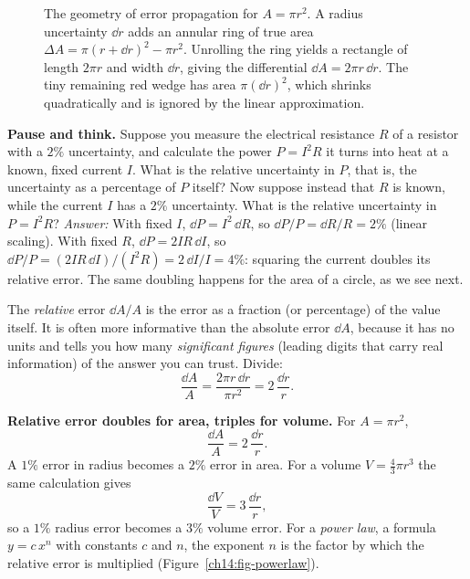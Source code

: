\begin{figure}[H]
\caption{The geometry of error propagation for $A = \pi r^2$. A radius uncertainty $\dd r$
adds an annular ring of true area $\Delta A = \pi(r+\dd r)^2 - \pi r^2$. Unrolling the ring
yields a rectangle of length $2\pi r$ and width $\dd r$, giving the differential $\dd A =
2\pi r\,\dd r$. The tiny remaining red wedge has area $\pi(\dd r)^2$, which shrinks quadratically
and is ignored by the linear approximation.}
\label{ch14:fig-circle-error}
\end{figure}

\begin{recoverybox}
\textbf{Pause and think.} Suppose you measure the electrical resistance $R$ of a resistor with a $2\%$ uncertainty, and calculate the power $P = I^2 R$ it turns into heat at a known, fixed current $I$. What is the relative uncertainty in $P$, that is, the uncertainty as a percentage of $P$ itself?
Now suppose instead that $R$ is known, while the current $I$ has a $2\%$ uncertainty. What is the relative uncertainty in $P = I^2 R$?
\emph{Answer:} With fixed $I$, $\dd P = I^2\,\dd R$, so $\dd P/P = \dd R/R = 2\%$ (linear scaling). With fixed $R$, $\dd P = 2IR\,\dd I$, so $\dd P/P = (2IR\,\dd I)/(I^2 R) = 2\,\dd I/I = 4\%$: squaring the current doubles its relative error. The same doubling happens for the area of a circle, as we see next.
\end{recoverybox}

The \emph{relative} error $\dd A/A$ is the error as a fraction (or percentage) of
the value itself. It is often more informative than the absolute error $\dd A$,
because it has no units and tells you how many \emph{significant figures} (leading
digits that carry real information) of the answer you can trust. Divide:
\[
\frac{\dd A}{A} = \frac{2\pi r\,\dd r}{\pi r^2} = 2\,\frac{\dd r}{r}.
\]

\begin{focusbox}
\textbf{Relative error doubles for area, triples for volume.} For $A = \pi r^2$,
\[
\frac{\dd A}{A} = 2\,\frac{\dd r}{r}.
\]
A $1\%$ error in radius becomes a $2\%$ error in area. For a volume $V = \tfrac43
\pi r^3$ the same calculation gives
\[
\frac{\dd V}{V} = 3\,\frac{\dd r}{r},
\]
so a $1\%$ radius error becomes a $3\%$ volume error. For a \emph{power law}, a formula
$y=c\,x^n$ with constants $c$ and $n$, the exponent $n$ is the factor by which the
relative error is multiplied (Figure~\ref{ch14:fig-powerlaw}).
\end{focusbox}

